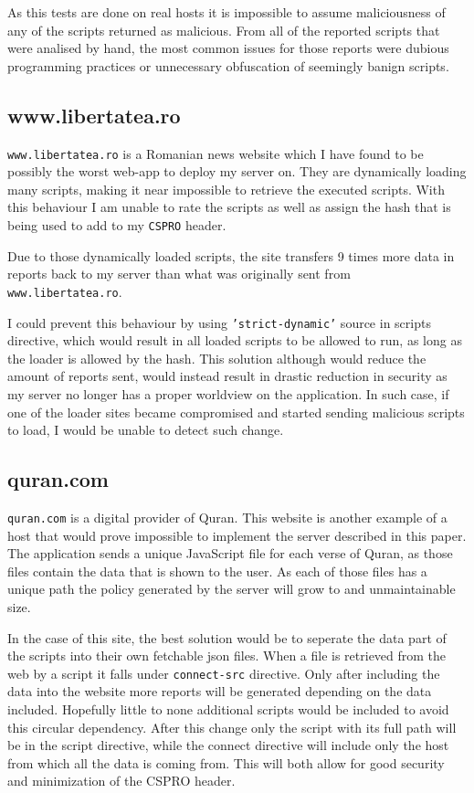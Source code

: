 As this tests are done on real hosts it is impossible to assume maliciousness of any of the scripts returned as malicious.
From all of the reported scripts that were analised by hand, the most common issues for those reports were dubious programming practices or unnecessary obfuscation of seemingly banign scripts.



\subsection{www.libertatea.ro}

\texttt{www.libertatea.ro} is a Romanian news website which I have found to be possibly the worst web-app to deploy my server on.
They are dynamically loading many scripts, making it near impossible to retrieve the executed scripts.
With this behaviour I am unable to rate the scripts as well as assign the hash that is being used to add to my \texttt{CSPRO} header.

Due to those dynamically loaded scripts, the site transfers 9 times more data in reports back to my server than what was originally sent from \texttt{www.libertatea.ro}.

I could prevent this behaviour by using \texttt{'strict-dynamic'} source in scripts directive, which would result in all loaded scripts to be allowed to run, as long as the loader is allowed by the hash.
This solution although would reduce the amount of reports sent, would instead result in drastic reduction in security as my server no longer has a proper worldview on the application.
In such case, if one of the loader sites became compromised and started sending malicious scripts to load, I would be unable to detect such change.

\subsection{quran.com}

\texttt{quran.com} is a digital provider of Quran. 
This website is another example of a host that would prove impossible to implement the server described in this paper.
The application sends a unique JavaScript file for each verse of Quran, as those files contain the data that is shown to the user.
As each of those files has a unique path the policy generated by the server will grow to and unmaintainable size.

In the case of this site, the best solution would be to seperate the data part of the scripts into their own fetchable json files.
When a file is retrieved from the web by a script it falls under \texttt{connect-src} directive. 
Only after including the data into the website more reports will be generated depending on the data included.
Hopefully little to none additional scripts would be included to avoid this circular dependency.
After this change only the script with its full path will be in the script directive, while the connect directive will include only the host from which all the data is coming from.
This will both allow for good security and minimization of the CSPRO header.

